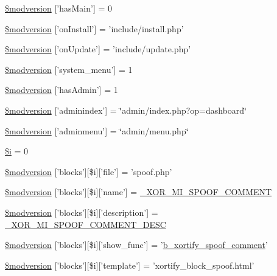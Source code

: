 \begin{DoxyCompactItemize}
\hyperlink{xoops__version_8php_abfb3e6806088c7dc1915d6306d0d4d15}{\$modversion} \mbox{[}'has\-Main'\mbox{]} = 0
\item 
\hyperlink{xoops__version_8php_a31e14c91e594cf1f3d23df166027f58c}{\$modversion} \mbox{[}'on\-Install'\mbox{]} = 'include/install.\-php'
\item 
\hyperlink{xoops__version_8php_acbce95e76b8d940e8d770b88e1bebe35}{\$modversion} \mbox{[}'on\-Update'\mbox{]} = 'include/update.\-php'
\item 
\hyperlink{xoops__version_8php_af411d21e51da7d68a9c87ce5f42238c8}{\$modversion} \mbox{[}'system\-\_\-menu'\mbox{]} = 1
\item 
\hyperlink{xoops__version_8php_a32e1c2084cd61fd8eed6ea4e1aa48f42}{\$modversion} \mbox{[}'has\-Admin'\mbox{]} = 1
\item 
\hyperlink{xoops__version_8php_a768e74a968bcadb55351611867c017b7}{\$modversion} \mbox{[}'adminindex'\mbox{]} = \char`\"{}admin/index.\-php?op=dashboard\char`\"{}
\item 
\hyperlink{xoops__version_8php_a677e42dae338738010a78548909bf2f5}{\$modversion} \mbox{[}'adminmenu'\mbox{]} = \char`\"{}admin/menu.\-php\char`\"{}
\item 
\hyperlink{xoops__version_8php_a83018d9153d17d91fbcf3bc10158d34f}{\$i} = 0
\item 
\hyperlink{xoops__version_8php_af819a0cd7a3333fb95204d77af465df7}{\$modversion} \mbox{[}'blocks'\mbox{]}\mbox{[}\$i\mbox{]}\mbox{[}'file'\mbox{]} = 'spoof.\-php'
\item 
\hyperlink{xoops__version_8php_a5951d3c081f73a382c5d953f6ab6f946}{\$modversion} \mbox{[}'blocks'\mbox{]}\mbox{[}\$i\mbox{]}\mbox{[}'name'\mbox{]} = \hyperlink{modinfo_8php_a1bb8f67ec25c264d7749c5189f85d046}{\-\_\-\-X\-O\-R\-\_\-\-M\-I\-\_\-\-S\-P\-O\-O\-F\-\_\-\-C\-O\-M\-M\-E\-N\-T}
\item 
\hyperlink{xoops__version_8php_a9a130deea7652d35c9c40af2597342ad}{\$modversion} \mbox{[}'blocks'\mbox{]}\mbox{[}\$i\mbox{]}\mbox{[}'description'\mbox{]} = \hyperlink{modinfo_8php_aac1f3cacc93cb5311e57b62ffa47f067}{\-\_\-\-X\-O\-R\-\_\-\-M\-I\-\_\-\-S\-P\-O\-O\-F\-\_\-\-C\-O\-M\-M\-E\-N\-T\-\_\-\-D\-E\-S\-C}
\item 
\hyperlink{xoops__version_8php_acfb54266647964e7122b4b97d18a7ef2}{\$modversion} \mbox{[}'blocks'\mbox{]}\mbox{[}\$i\mbox{]}\mbox{[}'show\-\_\-func'\mbox{]} = '\hyperlink{spoof_8php_ad7f6bff091c57019f377538b4c230400}{b\-\_\-xortify\-\_\-spoof\-\_\-comment}'
\item 
\hyperlink{xoops__version_8php_a109ef2781ee64346f869b02fe538d208}{\$modversion} \mbox{[}'blocks'\mbox{]}\mbox{[}\$i\mbox{]}\mbox{[}'template'\mbox{]} = 'xortify\-\_\-block\-\_\-spoof.\-html'

\end{DoxyCompactItemize}

